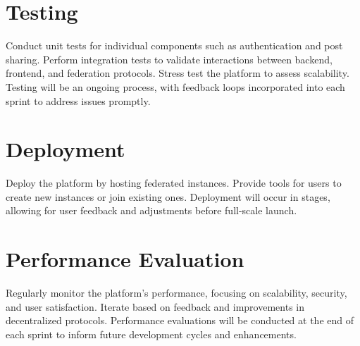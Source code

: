 \section{Testing}
Conduct unit tests for individual components such as authentication and post sharing. Perform integration tests to validate interactions between backend, frontend, and federation protocols. Stress test the platform to assess scalability. Testing will be an ongoing process, with feedback loops incorporated into each sprint to address issues promptly.

\section{Deployment}
Deploy the platform by hosting federated instances. Provide tools for users to create new instances or join existing ones. Deployment will occur in stages, allowing for user feedback and adjustments before full-scale launch.

\section{Performance Evaluation}
Regularly monitor the platform’s performance, focusing on scalability, security, and user satisfaction. Iterate based on feedback and improvements in decentralized protocols. Performance evaluations will be conducted at the end of each sprint to inform future development cycles and enhancements.
